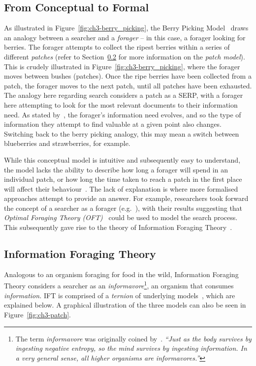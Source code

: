 \subsection{From Conceptual to Formal}\label{sec:stopping:theories:conceptual}
As illustrated in Figure~\ref{fig:ch3-berry_picking}, the Berry Picking Model~\citep{bates1989berry_picking} draws an analogy between a searcher and a \emph{forager} -- in this case, a forager looking for berries. The forager attempts to collect the ripest berries within a series of different \emph{patches} (refer to Section~\ref{sec:stopping:theories:ift} for more information on the \emph{patch model}). This is crudely illustrated in Figure~\ref{fig:ch3-berry_picking}, where the forager moves between bushes (patches). Once the ripe berries have been collected from a patch, the forager moves to the next patch, until all patches have been exhausted. The analogy here regarding search considers a patch as a SERP, with a forager here attempting to look for the most relevant documents to their information need. As stated by~\citeauthor{bates1989berry_picking}, the forager's information need evolves, and so the type of information they attempt to find valuable at a given point also changes. Switching back to the berry picking analogy, this may mean a switch between blueberries and strawberries, for example.

While this conceptual model is intuitive and subsequently easy to understand, the model lacks the ability to describe how long a forager will spend in an individual patch, or how long the time taken to reach a patch in the first place will affect their behaviour~\citep{azzopardi2015theories}. The lack of explanation is where more formalised approaches attempt to provide an answer. For example, researchers took forward the concept of a searcher as a forager (e.g.~\cite{russell1993sense_making, sandstrom1994optimal_foraging}), with their results suggesting that \emph{Optimal Foraging Theory (OFT)}~\citep{stephens1986foraging_theory} could be used to model the search process. This subsequently gave rise to the theory of Information Foraging Theory~\citep{pirolli1999ift}.

\subsection{Information Foraging Theory}\label{sec:stopping:theories:ift}
Analogous to an organism foraging for food in the wild, Information Foraging Theory considers a searcher as an \emph{informavore}\footnote{The term \emph{informavore} was originally coined by~\citeauthor{miller1983informavores}. \emph{``Just as the body survives by ingesting negative entropy, so the mind survives by ingesting information. In a very general sense, all higher organisms are informavores.''}}, an organism that consumes \emph{information.} IFT is comprised of a \emph{ternion} of underlying models~\cite{pirolli1999ift}, which are explained below. A graphical illustration of the three models can also be seen in Figure~\ref{fig:ch3-patch}.

